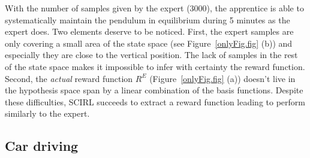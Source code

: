 \documentclass{article}
\begin{document}
With the number of samples given by the expert (3000), the
apprentice is able to systematically maintain the pendulum in
equilibrium during 5 minutes as the expert does.
%
%
Two elements deserve to be noticed. First, the expert samples are
only covering a small area of the state space (see
Figure~\ref{onlyFig.fig} (b)) and especially they are close to the
vertical position. The lack of samples in the rest of the state
space makes it impossible to infer with certainty the reward
function. Second, the \textit{actual} reward function $R^E$
(Figure~\ref{onlyFig.fig} (a)) doesn't live in the hypothesis space
span by a linear combination of the basis functions. Despite these
difficulties, SCIRL succeeds to extract a reward function leading to
perform similarly to the expert. %

\subsection{Car driving}
\end{document}
